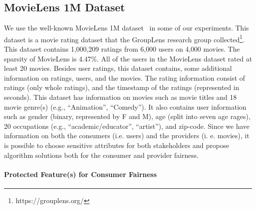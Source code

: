 

    \subsection{MovieLens 1M Dataset}
    
        We use the well-known MovieLens 1M dataset~\cite{movielens} in some of our experiments. This dataset is a movie rating dataset that the GroupLens research group collected\footnote{https://grouplens.org/}. This dataset contains 1,000,209 ratings from 6,000 users on 4,000 movies. The sparsity of MovieLens is 4.47\%. All of the users in the MovieLens dataset rated at least 20 movies. Besides user ratings, this dataset contains, some additional information on ratings, users, and the movies. The rating information consist of ratings (only whole ratings), and the timestamp of the ratings (represented in seconds). This dataset has information on movies such as movie titles and 18 movie genre(s) (e.g., ``Animation'', ``Comedy''). It also contains user information such as gender (binary, represented by F and M), age (split into seven age rages), 20 occupations (e.g., ``academic/educator'', ``artist''), and zip-code. Since we have information on both the consumers (i.e. users) and the providers (i. e. movies), it is possible to choose sensitive attributes for both stakeholders and propose algorithm solutions both for the consumer and provider fairness.
    
        \vspace{0.25cm}
        \noindent \paragraph{Protected Feature(s) for Consumer Fairness}
        \vspace{0.25cm}
 
